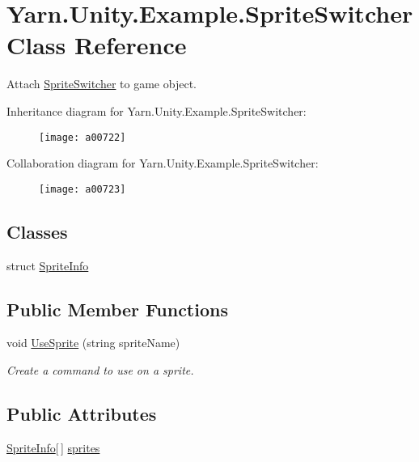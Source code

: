 \hypertarget{a00148}{\section{Yarn.\-Unity.\-Example.\-Sprite\-Switcher Class Reference}
\label{a00148}
}


Attach \hyperlink{a00148}{Sprite\-Switcher} to game object.  




Inheritance diagram for Yarn.\-Unity.\-Example.\-Sprite\-Switcher\-:
\nopagebreak
\begin{figure}[H]
\begin{center}
\leavevmode
\texttt{[image: a00722]}
\end{center}
\end{figure}


Collaboration diagram for Yarn.\-Unity.\-Example.\-Sprite\-Switcher\-:
\nopagebreak
\begin{figure}[H]
\begin{center}
\leavevmode
\texttt{[image: a00723]}
\end{center}
\end{figure}
\subsection*{Classes}
\begin{DoxyCompactItemize}
\item 
struct \hyperlink{a00148_a00357}{Sprite\-Info}
\end{DoxyCompactItemize}
\subsection*{Public Member Functions}
\begin{DoxyCompactItemize}
\item 
void \hyperlink{a00148_ac26718b713f342f3de8f3e569c5b62da}{Use\-Sprite} (string sprite\-Name)
\begin{DoxyCompactList}\small\item\em Create a command to use on a sprite. \end{DoxyCompactList}\end{DoxyCompactItemize}
\subsection*{Public Attributes}
\begin{DoxyCompactItemize}
\item 
\hyperlink{a00148_a00357}{Sprite\-Info}\mbox{[}$\,$\mbox{]} \hyperlink{a00148_a1e85d9f4f6b33ca7ae638cce2eb704aa}{sprites}
\end{DoxyCompactItemize}


